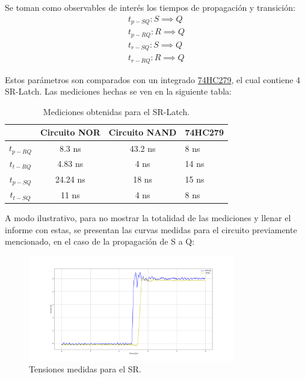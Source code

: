 Se toman como observables de interés los tiempos de propagación y transición:
\begin{equation*}
\begin{split}
	t_{p-SQ}: S \implies Q \\
	t_{p-RQ}: R \implies Q \\
	t_{r-SQ}: S \implies Q \\
	t_{r-RQ}: R \implies Q
\end{split}
\end{equation*}

Estos parámetros son comparados con un integrado \href{http://noel.feld.cvut.cz/hw/st/1937.pdf}{74HC279}, el cual contiene 4 SR-Latch. Las mediciones hechas se ven en la siguiente tabla:
\begin{table}[H]
\centering
\begin{tabular}{cccl}
\hline
\textit{}           & \textbf{Circuito NOR} & \textbf{Circuito NAND} & \textbf{74HC279} \\ \hline
\textbf{$t_{p-RQ}$} & 8.3 ns                 & 43.2 ns                 & 8 ns              \\
\textbf{$t_{t-RQ}$} & 4.83 ns                & 4 ns                    & 14 ns             \\
\textbf{$t_{p-SQ}$} & 24.24 ns               & 18 ns                   & 15 ns             \\
\textbf{$t_{t-SQ}$} & 11 ns                  & 4 ns                    & 8 ns             \\
\hline
\end{tabular}
\caption{Mediciones obtenidas para el SR-Latch.}
\label{tab:srl}
\end{table}

A modo ilustrativo, para no mostrar la totalidad de las mediciones y llenar el informe con estas, se presentan las curvas medidas para el circuito previamente mencionado, en el caso de la propagación de S a Q:
\begin{figure}[H]	
	\centering
	\includegraphics[width=0.8\textwidth]{ImagenesEjercicio6/Medicion-SR.png}
	\caption{Tensiones medidas para el SR.}
	\label{fig:medsr}
\end{figure}

